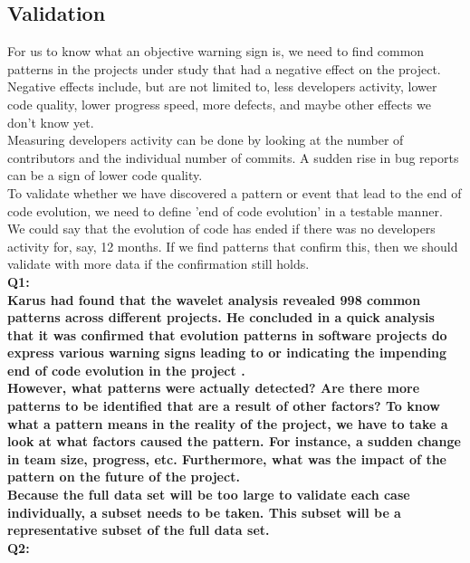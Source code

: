 \subsection{Validation}
For us to know what an objective warning sign is, we need to find common
patterns in the projects under study that had a negative effect on the project.
Negative effects include, but are not limited to, less developers activity,
lower code quality, lower progress speed, more defects, and maybe other effects
we don't know yet.
\\

Measuring developers activity can be done by looking at the number of
contributors and the individual number of commits. A sudden rise in bug reports
can be a sign of lower code quality.
\\

To validate whether we have discovered a pattern or event that lead to the end
of code evolution, we need to define 'end of code evolution' in a testable
manner. We could say that the evolution of code has ended if there was no
developers activity for, say, 12 months. If we find patterns that confirm this,
then we should validate with more data if the confirmation still holds.
\\

\noindent
\bfseries{Q1: \emph{\subQuestionOne}}\rm
\\

Karus had found that the wavelet analysis revealed 998 common patterns across
different projects. He concluded in a quick analysis that it was confirmed that
evolution patterns in software projects do express various warning signs leading
to or indicating the impending end of code evolution in the project
\cite{karus2013}.
\\

However, what patterns were actually detected? Are there more patterns to be
identified that are a result of other factors? To know what a pattern means in
the reality of the project, we have to take a look at what factors caused the
pattern. For instance, a sudden change in team size, progress, etc. Furthermore,
what was the impact of the pattern on the future of the project.
\\

Because the full data set will be too large to validate each case individually,
a subset needs to be taken. This subset will be a representative subset of the
full data set.
\\

\noindent
\bfseries{Q2: \emph{\subQuestionTwo}}\rm
\\

